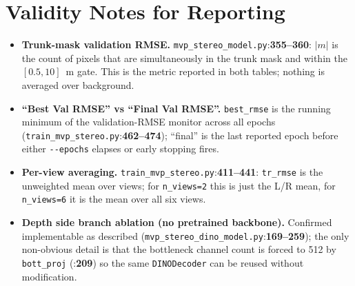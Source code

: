 \documentclass[11pt]{article}
\newcommand{\fref}[2]{\texttt{\textcolor{filegray}{#1}}:\textbf{#2}}
\begin{document}
\section{Validity Notes for Reporting}

\begin{itemize}[leftmargin=2em]
  \item \textbf{Trunk-mask validation RMSE.}
        \fref{mvp\_stereo\_model.py}{355--360}: $|m|$ is the count of
        pixels that are simultaneously in the trunk mask and within the
        $[0.5,10]$~m gate. This is the metric reported in both tables;
        nothing is averaged over background.
  \item \textbf{``Best Val RMSE'' vs ``Final Val RMSE''.}
        \texttt{best\_rmse} is the running minimum of the
        validation-RMSE monitor across all epochs
        (\fref{train\_mvp\_stereo.py}{462--474}); ``final'' is the
        last reported epoch before either \texttt{-{}-epochs} elapses
        or early stopping fires.
  \item \textbf{Per-view averaging.}
        \fref{train\_mvp\_stereo.py}{411--441}:
        \texttt{tr\_rmse} is the unweighted mean over views; for
        \texttt{n\_views=2} this is just the L/R mean, for
        \texttt{n\_views=6} it is the mean over all six views.
  \item \textbf{Depth side branch ablation (no pretrained backbone).}
        Confirmed implementable as described
        (\fref{mvp\_stereo\_dino\_model.py}{169--259}); the only
        non-obvious detail is that the bottleneck channel count is
        forced to 512 by \texttt{bott\_proj}
        (\fref{}{209}) so the same \texttt{DINODecoder} can be reused
        without modification.
\end{itemize}
\end{document}
